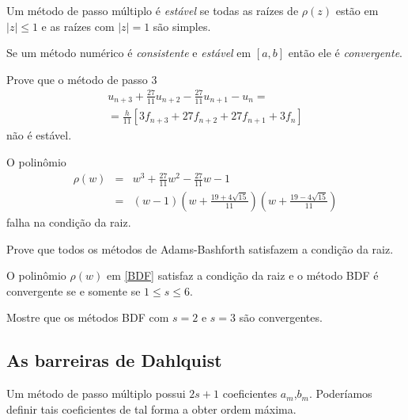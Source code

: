 \begin{teo}
Um método de passo múltiplo é \emph{estável} se todas as raízes de  $\rho (z)$ estão em $|z|\leq 1$ e as raízes com $|z|=1$ são simples.
\end{teo}


\begin{teo}
Se um método numérico é \emph{consistente} e \emph{estável} em $[a,b]$ então ele é \emph{convergente}.
\end{teo}



\begin{ex}
Prove que o método de passo $3$
\begin{eqnarray}\label{multis3}
  u_{n+3} +\frac{27}{11}u_{n+2} -\frac{27}{11}u_{n+1} -u_{n}  =\\
   =\frac{h}{11} [3 f_{n+3}+27f_{n+2}+27f_{n+1} +3f_{n}]
\end{eqnarray}
não é estável.
\end{ex}
\begin{sol}
O polinômio
\begin{eqnarray}
   \rho (w) &=&w^3+\frac{27}{11}w^2 -\frac{27}{11}w -1 \\
        &=&(w-1)\left(w+\frac{19+4\sqrt{15}}{11}\right)
                \left(w+\frac{19-4\sqrt{15}}{11}\right)
\end{eqnarray}
falha na condição da raiz.
\end{sol}




\begin{exer}
Prove que todos os métodos de Adams-Bashforth satisfazem a condição da raiz.
\end{exer}

\begin{teo}
O polinômio $\rho (w)$ em \eqref{BDF} satisfaz a condição da raiz e o método BDF é convergente se e somente se $1\leq s\leq 6$.
\end{teo}

\begin{exer}
Mostre que os métodos BDF com $s=2$ e $s=3$ são convergentes.
\end{exer}



\subsection{As barreiras de Dahlquist}
Um método de passo múltiplo possui $2s+1$ coeficientes $a_m$,$b_m$. Poderíamos definir tais coeficientes de tal forma a obter ordem máxima.

